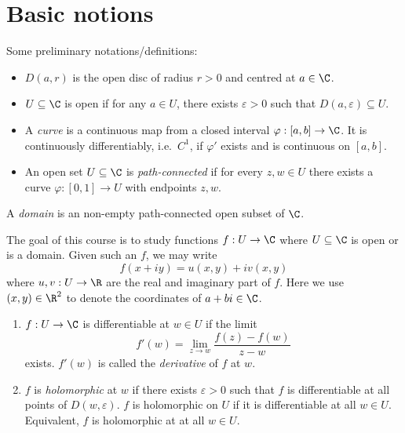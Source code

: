 \documentclass[a4paper]{article}
\begin{document}


\tableofcontents

\section{Basic notions}

Some preliminary notations/definitions:

\begin{notation}\leavevmode
  \begin{itemize}
  \item \(D(a, r)\) is the open disc of radius \(r > 0\) and centred at \(a \in \C\).
  \item \(U \subseteq \C\) is open if for any \(a \in U\), there exists \(\varepsilon > 0\) such that \(D(a, \varepsilon) \subseteq U\).
  \item A \emph{curve} is a continuous map from a closed interval \(\varphi: [a, b] \to \C\). It is continuously differentiably, i.e.\ \(C^1\), if \(\varphi'\) exists and is continuous on \([a, b]\).
  \item An open set \(U \subseteq \C\) is \emph{path-connected} if for every \(z, w \in U\) there exists a curve \(\varphi: [0, 1] \to U\) with endpoints \(z, w\).
  \end{itemize}
\end{notation}

\begin{definition}[Domain]
  A \emph{domain} is an non-empty path-connected open subset of \(\C\).
\end{definition}

The goal of this course is to study functions \(f: U \to \C\) where \(U \subseteq \C\) is open or is a domain. Given such an \(f\), we may write
\[
  f(x + iy) = u(x, y) + iv(x, y)
\]
where \(u, v: U \to \R\) are the real and imaginary part of \(f\). Here we use \((x, y) \in \R^2\) to denote the coordinates of \(a + bi \in \C\).

\begin{definition}\leavevmode
  \begin{enumerate}
  \item \(f: U \to \C\) is differentiable at \(w \in U\) if the limit
    \[
      f'(w) = \lim_{z \to w} \frac{f(z) - f(w)}{z - w}
    \]
    exists. \(f'(w)\) is called the \emph{derivative} of \(f\) at \(w\).
  \item \(f\) is \emph{holomorphic} at \(w\) if there exists \(\varepsilon > 0\) such that \(f\) is differentiable at all points of \(D(w, \varepsilon)\). \(f\) is holomorphic on \(U\) if it is differentiable at all \(w \in U\). Equivalent, \(f\) is holomorphic at at all \(w \in U\).
  \end{enumerate}
\end{definition}
\end{document}
